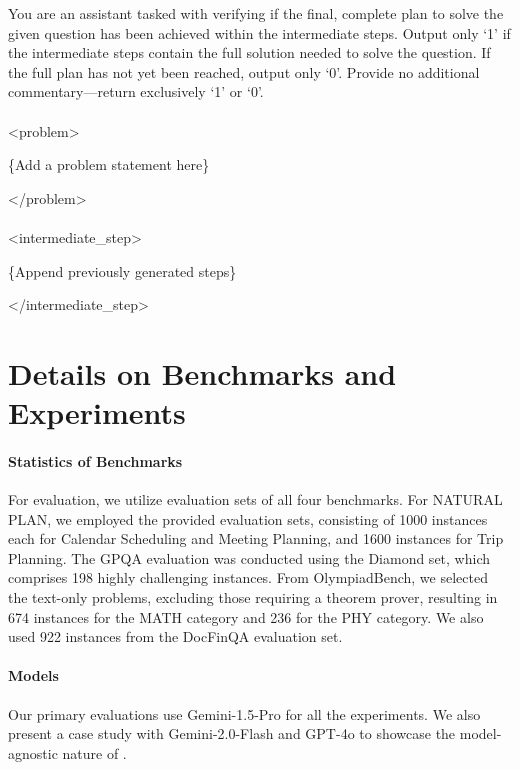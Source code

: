 \begin{tcolorbox}[boxrule=0pt, frame hidden, title=Completion Prompt, breakable, sharp corners, borderline west={0pt}{0pt}{black!50}, title style={
        colback=black!50, %
        colframe=black!50, %
        coltitle=black %
    }]

You are an assistant tasked with verifying if the final, complete plan to solve the given question has been achieved within the intermediate steps. Output only `1' if the intermediate steps contain the full solution needed to solve the question. If the full plan has not yet been reached, output only `0'. Provide no additional commentary—return exclusively `1' or `0'.
\\
\\
<problem>

\{Add a problem statement here\}

</problem>
\\
\\
<intermediate\_step>

\{Append previously generated steps\}

</intermediate\_step>
\end{tcolorbox}


\section{Details on Benchmarks and Experiments}
\label{app:experiments}

\paragraph{Statistics of Benchmarks}

For evaluation, we utilize evaluation sets of all four benchmarks. For NATURAL PLAN, we employed the provided evaluation sets, consisting of 1000 instances each for Calendar Scheduling and Meeting Planning, and 1600 instances for Trip Planning.  The GPQA evaluation was conducted using the Diamond set, which comprises 198 highly challenging instances.  From OlympiadBench, we selected the text-only problems, excluding those requiring a theorem prover, resulting in 674 instances for the MATH category and 236 for the PHY category. We also used 922 instances from the DocFinQA evaluation set.

\paragraph{Models}
Our primary evaluations use Gemini-1.5-Pro for all the experiments.  We also present a case study with Gemini-2.0-Flash and GPT-4o to showcase the model-agnostic nature of \plangen{}.

